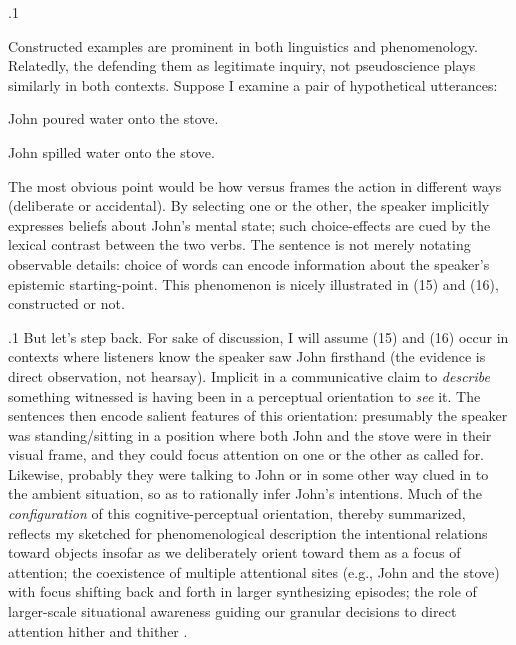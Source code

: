 \documentclass[11pt, twocolumn]{article}
\begin{document}
\p.1{%
\:\+Constructed examples are prominent in both linguistics
and phenomenology. \> Relatedly, the 
\mdash{} defending them as legitimate inquiry, not pseudoscience
\mdash{} plays similarly in both contexts. \> Suppose I examine a
pair of hypothetical utterances:\<

\begin{exsGroup}

\exsItem{}   John poured water onto the stove.

\exsItem{}   John spilled water onto the stove.

\end{exsGroup}

\nip{}%
\+The most obvious point would be how  versus  frames the
action in different ways (deliberate or accidental). \> By selecting
one or the other, the speaker implicitly expresses beliefs about
John's mental state; such choice-effects are cued by the lexical contrast
between the two verbs. \> The
sentence is not merely notating observable details: choice of words can encode information about the speaker's
epistemic starting-point. \> This phenomenon
is nicely illustrated in \exsRef(15) and \exsRef(16), 
constructed or not.\<\;
} %

\p.1{%
\:\+But let's step back. \> For sake of discussion, I will assume \exsRef(15) and \exsRef(16)
occur in contexts where listeners know the speaker saw John firsthand
(the evidence is direct observation, not hearsay). \> Implicit
in a communicative claim to \textit{describe} something witnessed
is having been in a perceptual orientation to \textit{see} it. \> The
sentences then encode salient features of this orientation:
presumably the speaker was standing/sitting in a position
where both John and the stove were in their visual frame,
and they could focus attention on one or the other as
called for. \> Likewise, probably they were talking to
John or in some other way clued in to the ambient situation, so
as to rationally infer John's intentions. \> Much of the
\textit{configuration} of this cognitive-perceptual orientation,
thereby summarized, reflects my sketched 
for phenomenological description \mdash{} the intentional relations toward
objects insofar as we deliberately orient toward them
as a focus of attention; the coexistence of multiple
attentional sites (e.g., John and the stove) with focus
shifting back and forth in larger synthesizing episodes;
the role of larger-scale situational awareness guiding
our granular decisions to direct attention hither and
thither .\<\;
} %
\end{document}
